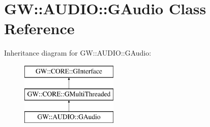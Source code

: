 \hypertarget{class_g_w_1_1_a_u_d_i_o_1_1_g_audio}{}\section{GW\+:\+:A\+U\+D\+IO\+:\+:G\+Audio Class Reference}
\label{class_g_w_1_1_a_u_d_i_o_1_1_g_audio}
Inheritance diagram for GW\+:\+:A\+U\+D\+IO\+:\+:G\+Audio\+:\begin{figure}[H]
\begin{center}
\leavevmode
\includegraphics[height=3.000000cm]{class_g_w_1_1_a_u_d_i_o_1_1_g_audio}
\end{center}
\end{figure}
